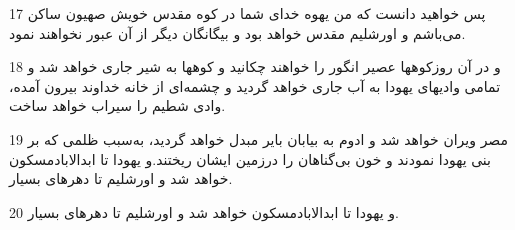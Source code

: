 \par 17 پس خواهید دانست که من یهوه خدای شما در کوه مقدس خویش صهیون ساکن می‌باشم و اورشلیم مقدس خواهد بود و بیگانگان دیگر از آن عبور نخواهند نمود.
\par 18 و در آن روزکوهها عصیر انگور را خواهند چکانید و کوهها به شیر جاری خواهد شد و تمامی وادیهای یهودا به آب جاری خواهد گردید و چشمه‌ای از خانه خداوند بیرون آمده، وادی شطیم را سیراب خواهد ساخت.
\par 19 مصر ویران خواهد شد و ادوم به بیابان بایر مبدل خواهد گردید، به‌سبب ظلمی که بر بنی یهودا نمودند و خون بی‌گناهان را درزمین ایشان ریختند.و یهودا تا ابدالابادمسکون خواهد شد و اورشلیم تا دهرهای بسیار.
\par 20 و یهودا تا ابدالابادمسکون خواهد شد و اورشلیم تا دهرهای بسیار.




